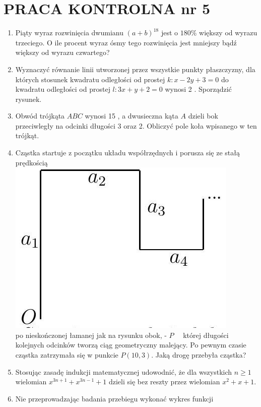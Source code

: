 \documentclass[10pt]{article}
\begin{document}
\section*{PRACA KONTROLNA nr 5}
\begin{enumerate}
  \item Piąty wyraz rozwinięcia dwumianu $(a+b)^{18}$ jest o $180 \%$ większy od wyrazu trzeciego. O ile procent wyraz ósmy tego rozwinięcia jest mniejszy bądź większy od wyrazu czwartego?
  \item Wyznaczyć równanie linii utworzonej przez wszystkie punkty płaszczyzny, dla których stosunek kwadratu odległości od prostej $k: x-2 y+3=0$ do kwadratu odległości od prostej $l: 3 x+y+2=0$ wynosi 2 . Sporządzić rysunek.
  \item Obwód trójkąta $A B C$ wynosi 15 , a dwusieczna kąta $A$ dzieli bok przeciwległy na odcinki długości 3 oraz 2. Obliczyć pole koła wpisanego w ten trójkąt.
  \item Cząstka startuje z początku układu współrzędnych i porusza się ze stałą prędkością\\
\includegraphics[max width=\textwidth, center]{2024_11_16_1cec5a7f77f0b03e9e54g-5}\\
po nieskończonej łamanej jak na rysunku obok, - $P \quad$ której długości kolejnych odcinków tworzą ciąg geometryczny malejący. Po pewnym czasie cząstka zatrzymała się w punkcie $P(10,3)$. Jaką drogę przebyła cząstka?
  \item Stosując zasadę indukcji matematycznej udowodnić, że dla wszystkich $n \geqslant 1$ wielomian $x^{3 n+1}+x^{3 n-1}+1$ dzieli się bez reszty przez wielomian $x^{2}+x+1$.
  \item Nie przeprowadzając badania przebiegu wykonać wykres funkcji
\end{enumerate}
\end{document}
